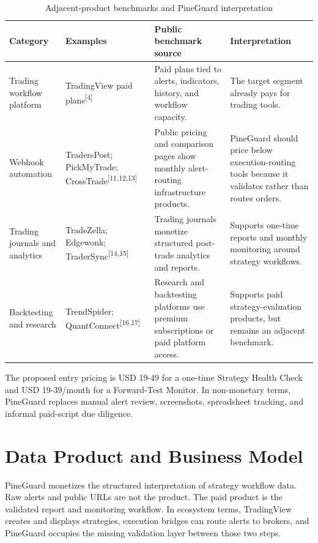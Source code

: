 \documentclass[11pt,a4paper]{article}
\newcommand{\src}[1]{\textsuperscript{[#1]}}
\begin{document}
\begin{table}[H]
\centering
\caption{Adjacent-product benchmarks and PineGuard interpretation}
\scriptsize
\begin{tabularx}{\textwidth}{>{\raggedright\arraybackslash}p{2.55cm}>{\raggedright\arraybackslash}p{3.2cm}>{\raggedright\arraybackslash}p{3.25cm}X}
\toprule
\textbf{Category} & \textbf{Examples} & \textbf{Public benchmark source} & \textbf{Interpretation} \\
\midrule
Trading workflow platform & TradingView paid plans\src{4} & Paid plans tied to alerts, indicators, history, and workflow capacity. & The target segment already pays for trading tools. \\
Webhook automation & TradersPost; PickMyTrade; CrossTrade\src{11,12,13} & Public pricing and comparison pages show monthly alert-routing infrastructure products. & PineGuard should price below execution-routing tools because it validates rather than routes orders. \\
Trading journals and analytics & TradeZella; Edgewonk; TraderSync\src{14,15} & Trading journals monetize structured post-trade analytics and reports. & Supports one-time reports and monthly monitoring around strategy workflows. \\
Backtesting and research & TrendSpider; QuantConnect\src{16,17} & Research and backtesting platforms use premium subscriptions or paid platform access. & Supports paid strategy-evaluation products, but remains an adjacent benchmark. \\
\bottomrule
\end{tabularx}
\end{table}

The proposed entry pricing is USD 19-49 for a one-time Strategy Health Check and USD 19-39/month for a Forward-Test Monitor. In non-monetary terms, PineGuard replaces manual alert review, screenshots, spreadsheet tracking, and informal paid-script due diligence.

\section{Data Product and Business Model}

PineGuard monetizes the structured interpretation of strategy workflow data. Raw alerts and public URLs are not the product. The paid product is the validated report and monitoring workflow. In ecosystem terms, TradingView creates and displays strategies, execution bridges can route alerts to brokers, and PineGuard occupies the missing validation layer between those two steps.
\end{document}
